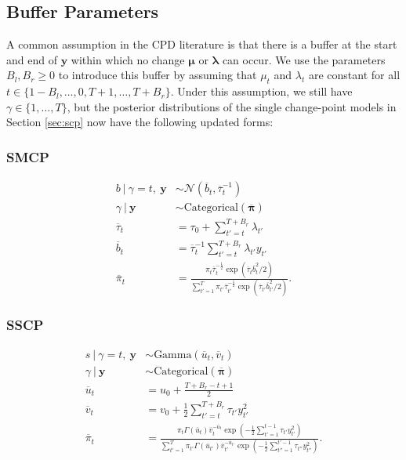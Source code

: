 \subsection{Buffer Parameters}
\label{app:buffer}

A common assumption in the CPD literature is that there is a buffer at the start and end of $\mathbf{y}$ within which no change $\boldsymbol{\mu}$ or $\boldsymbol{\lambda}$ can occur. We use the parameters $B_l,B_r \geq 0$ to introduce this buffer by assuming that $\mu_t$ and $\lambda_t$ are constant for all $t\in\{1-B_l,\ldots,0,T+1, \ldots, T+B_r\}$. Under this assumption, we still have $\gamma \in \{1,\ldots,T\}$, but the posterior distributions of the single change-point models in Section \ref{sec:scp} now have the following updated forms:

\subsubsection{SMCP}
\small
\begin{align*}
    b \:|\: \gamma = t, \: \mathbf{y} &\sim \mathcal{N}\left(\overline{b}_{t}, \overline{\tau}_{t}^{-1}\right) \\
    \gamma \:|\: \mathbf{y} &\sim \text{Categorical}(\overline{\boldsymbol{\pi}}) \\
    \overline{\tau}_t &= \tau_0 + \sum_{t'=t}^{T+B_r} \lambda_{t'} \\
    \overline{b}_t &= \overline{\tau}^{-1}_t\sum_{t'=t}^{T+B_r} \lambda_{t'} y_{t'} \\
    \overline{\pi}_t &= \frac{\pi_t\overline{\tau}^{-\frac{1}{2}}_t\exp\left(\overline{\tau}_t\overline{b}^2_t / 2\right)}{\sum_{t'=1}^T \pi_{t'}\overline{\tau}^{-\frac{1}{2}}_{t'}\exp\left(\overline{\tau}_{t'}\overline{b}^2_{t'} / 2\right)}.
\end{align*}
\normalsize

\subsubsection{SSCP}
\small
\begin{align*}
    s \:|\: \gamma = t, \: \mathbf{y} &\sim \text{Gamma}\left(\overline{u}_{t}, \overline{v}_{t}\right)  \\
    \gamma \:|\: \mathbf{y}&\sim \text{Categorical}(\overline{\boldsymbol{\pi}}) \\
    \overline{u}_{t} &= u_0 + \frac{T +B_r - t + 1}{2} \\
    \overline{v}_{t} &= v_0 + \frac{1}{2} \sum_{t'=t}^{T+B_r} \tau_{t'}y_{t'}^2 \\
    \overline{\pi}_t &= \frac{\pi_t \Gamma(\overline{u}_{t}) \overline{v}_{t}^{-\overline{u}_{t}}\exp\left(- \frac{1}{2}\sum_{t'=1}^{t-1} \tau_{t'}y_{t'}^2\right)}{\sum_{t'=1}^T \pi_{t'} \Gamma(\overline{u}_{t'}) \overline{v}_{t'}^{-\overline{u}_{t'}}\exp\left(- \frac{1}{2}\sum_{t''=1}^{t'-1} \tau_{t''}y_{t''}^2\right)}.
\end{align*}
\normalsize

